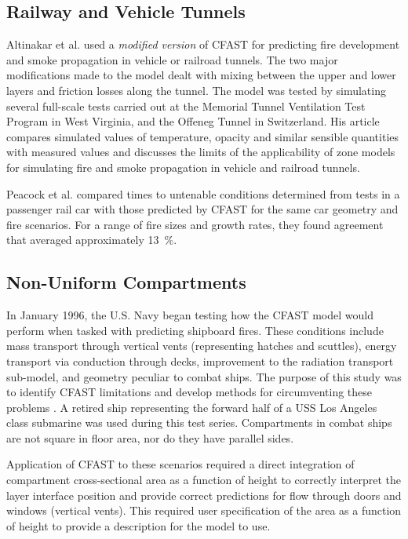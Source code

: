 \subsection{Railway and Vehicle Tunnels}

Altinakar et al. \cite{Altinakar:1997} used a \emph{modified version} of CFAST for predicting fire development and smoke propagation in vehicle or railroad tunnels. The two major modifications made to the model dealt with mixing between the upper and lower layers and friction losses along the tunnel. The model was tested by simulating several full-scale tests carried out at the Memorial Tunnel Ventilation Test Program in West Virginia, and the Offeneg Tunnel in Switzerland. His article compares simulated values of temperature, opacity and similar sensible quantities with measured values and discusses the limits of the applicability of zone models for simulating fire and smoke propagation in vehicle and railroad tunnels.

Peacock et al. \cite{Peacock:2004} compared times to untenable conditions determined from tests in a passenger rail car with those predicted by CFAST for the same car geometry and fire scenarios. For a range of fire sizes and growth rates, they found agreement that averaged approximately 13~\%.

\subsection{Non-Uniform Compartments}

In January 1996, the U.S. Navy began testing how the CFAST model would perform when tasked with predicting shipboard fires. These conditions include mass transport through vertical vents (representing hatches and scuttles), energy transport via conduction through decks, improvement to the radiation transport sub-model, and geometry peculiar to combat ships. The purpose of this study was to identify CFAST limitations and develop methods for circumventing these problems \cite{Hoover:2001}. A retired ship representing the forward half of a {USS} Los Angeles class submarine was used during this test series. Compartments in combat ships are not square in floor area, nor do they have parallel sides.

Application of CFAST to these scenarios required a direct integration of compartment cross-sectional area as a function of height to correctly interpret the layer interface position and provide correct predictions for flow through doors and windows (vertical vents). This required user specification of the area as a function of height to provide a description for the model to use.
